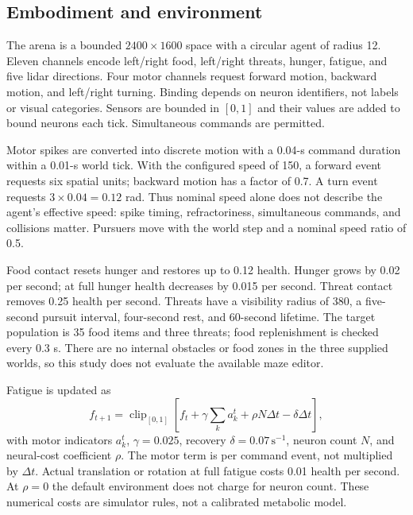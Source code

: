 \documentclass[11pt]{article}
\begin{document}
\subsection{Embodiment and environment}
The arena is a bounded $2400\times1600$ space with a circular agent of radius 12. Eleven channels encode left/right food, left/right threats, hunger, fatigue, and five lidar directions. Four motor channels request forward motion, backward motion, and left/right turning. Binding depends on neuron identifiers, not labels or visual categories. Sensors are bounded in $[0,1]$ and their values are added to bound neurons each tick. Simultaneous commands are permitted.

Motor spikes are converted into discrete motion with a 0.04-s command duration within a 0.01-s world tick. With the configured speed of 150, a forward event requests six spatial units; backward motion has a factor of 0.7. A turn event requests $3\times0.04=0.12$ rad. Thus nominal speed alone does not describe the agent's effective speed: spike timing, refractoriness, simultaneous commands, and collisions matter. Pursuers move with the world step and a nominal speed ratio of 0.5.

Food contact resets hunger and restores up to 0.12 health. Hunger grows by 0.02 per second; at full hunger health decreases by 0.015 per second. Threat contact removes 0.25 health per second. Threats have a visibility radius of 380, a five-second pursuit interval, four-second rest, and 60-second lifetime. The target population is 35 food items and three threats; food replenishment is checked every 0.3 s. There are no internal obstacles or food zones in the three supplied worlds, so this study does not evaluate the available maze editor.

Fatigue is updated as
\begin{equation}
 f_{t+1}=\operatorname{clip}_{[0,1]}\left[f_t+\gamma\sum_k a_k^t+\rho N\Delta t-\delta\Delta t\right],
\end{equation}
with motor indicators $a_k^t$, $\gamma=0.025$, recovery $\delta=0.07\,\mathrm{s}^{-1}$, neuron count $N$, and neural-cost coefficient $\rho$. The motor term is per command event, not multiplied by $\Delta t$. Actual translation or rotation at full fatigue costs 0.01 health per second. At $\rho=0$ the default environment does not charge for neuron count. These numerical costs are simulator rules, not a calibrated metabolic model.
\end{document}
